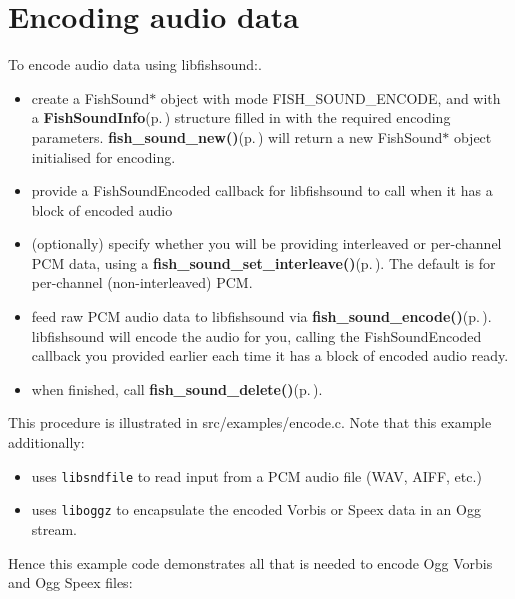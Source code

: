 \section{Encoding audio data}
\label{group__encode}
To encode audio data using libfishsound:.  
\begin{itemize}
\item create a Fish\-Sound$\ast$ object with mode FISH\_\-SOUND\_\-ENCODE, and with a {\bf Fish\-Sound\-Info}{\rm (p.\,\pageref{structFishSoundInfo})} structure filled in with the required encoding parameters. {\bf fish\_\-sound\_\-new()}{\rm (p.\,\pageref{fishsound_8h_a4})} will return a new Fish\-Sound$\ast$ object initialised for encoding.\item provide a Fish\-Sound\-Encoded callback for libfishsound to call when it has a block of encoded audio\item (optionally) specify whether you will be providing interleaved or per-channel PCM data, using a {\bf fish\_\-sound\_\-set\_\-interleave()}{\rm (p.\,\pageref{fishsound_8h_a14})}. The default is for per-channel (non-interleaved) PCM.\item feed raw PCM audio data to libfishsound via {\bf fish\_\-sound\_\-encode()}{\rm (p.\,\pageref{fishsound_8h_a8})}. libfishsound will encode the audio for you, calling the Fish\-Sound\-Encoded callback you provided earlier each time it has a block of encoded audio ready.\item when finished, call {\bf fish\_\-sound\_\-delete()}{\rm (p.\,\pageref{fishsound_8h_a11})}.\end{itemize}


This procedure is illustrated in src/examples/encode.c. Note that this example additionally:\begin{itemize}
\item uses {\tt libsndfile} to read input from a PCM audio file (WAV, AIFF, etc.)\item uses {\tt liboggz} to encapsulate the encoded Vorbis or Speex data in an Ogg stream.\end{itemize}


Hence this example code demonstrates all that is needed to encode Ogg Vorbis and Ogg Speex files:




